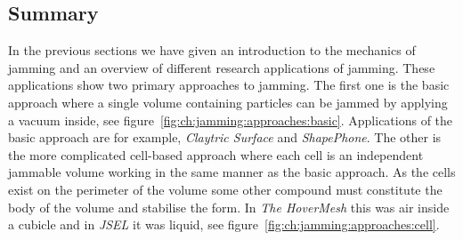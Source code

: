 \subsection{Summary}

In the previous sections we have given an introduction to the mechanics of jamming and an overview of different research applications of jamming.
These applications show two primary approaches to jamming.
The first one is the basic approach where a single volume containing particles can be jammed by applying a vacuum inside, see figure~\ref{fig:ch:jamming:approaches:basic}.
Applications of the basic approach are for example, \emph{Claytric Surface} and \emph{ShapePhone}.
The other is the more complicated cell-based approach where each cell is an independent jammable volume working in the same manner as the basic approach.
As the cells exist on the perimeter of the volume some other compound must constitute the body of the volume and stabilise the form.
In \emph{The HoverMesh} this was air inside a cubicle and in \emph{JSEL} it was liquid, see figure~\ref{fig:ch:jamming:approaches:cell}.

